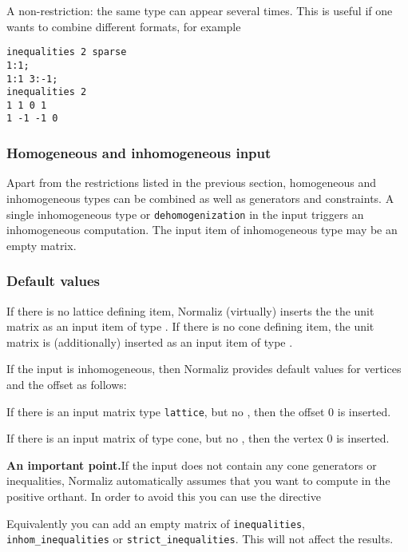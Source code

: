A non-restriction: the same type can appear several times. This is useful if one wants to combine different formats, for example
\begin{Verbatim}
inequalities 2 sparse
1:1;
1:1 3:-1;
inequalities 2
1 1 0 1
1 -1 -1 0
\end{Verbatim}

\subsubsection{Homogeneous and inhomogeneous input}\label{inhom_inp}

Apart from the restrictions listed in the previous section, homogeneous and inhomogeneous types can be combined as well as generators and constraints. A single inhomogeneous type or \verb|dehomogenization| in the input triggers an inhomogeneous computation. The input item of inhomogeneous type may be an empty matrix.

\subsubsection{Default values}\label{default}

If there is no lattice defining item, Normaliz (virtually) inserts the the unit matrix as an input item of type . If there is no cone defining item, the unit matrix is (additionally) inserted as an input item of type .

If the input is inhomogeneous, then Normaliz provides default values for vertices and the offset as follows:
\begin{arab}
	\item If there is an input matrix type \verb|lattice|, but no , then the offset $0$ is inserted.
	\item If there is an input matrix of type cone, but no , then the vertex $0$ is inserted.
\end{arab}

\textbf{An important point.}\enspace If the input does not contain any cone generators or inequalities, Normaliz automatically assumes that you want to compute in the positive orthant. In order to avoid this you can use the directive
\begin{itemize}
\end{itemize}

Equivalently you can add an empty matrix of \verb|inequalities|, \verb|inhom_inequalities| or \verb|strict_inequalities|. This will not affect the results.


